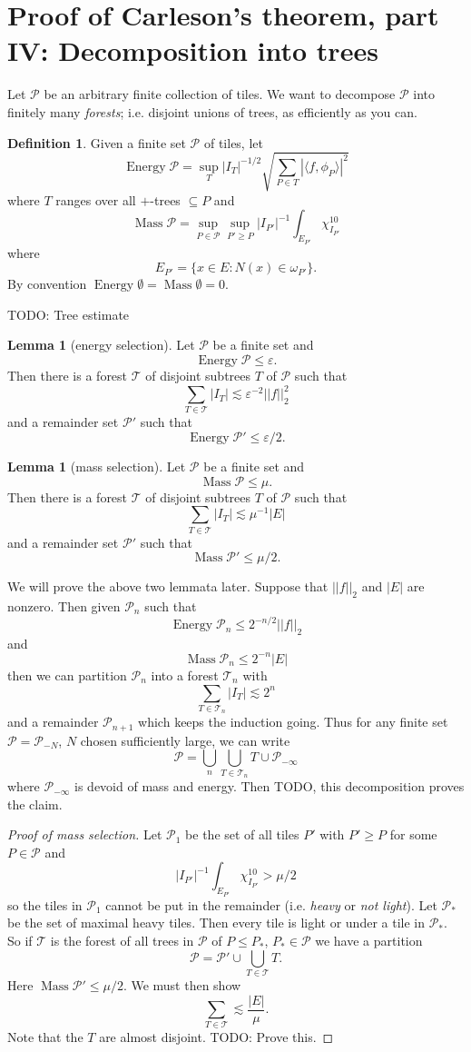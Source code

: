 \documentclass[12pt]{report}
\DeclareMathOperator*{\Energy}{Energy}
\DeclareMathOperator*{\Mass}{Mass}
\newcommand{\dfn}[1]{\emph{#1}\index{#1}}
\theoremstyle{definition}
\newtheorem{lemma}[theorem]{Lemma}
\newtheorem{definition}[theorem]{Definition}
\begin{document}
\section{Proof of Carleson's theorem, part IV: Decomposition into trees}
Let $\mathcal P$ be an arbitrary finite collection of tiles.
We want to decompose $\mathcal P$ into finitely many \dfn{forests}; i.e. disjoint unions of trees, as efficiently as you can.
\begin{definition}
Given a finite set $\mathcal P$ of tiles, let
$$\Energy \mathcal P = \sup_T |I_T|^{-1/2} \sqrt{\sum_{P \in T} |\langle f, \phi_P\rangle|^2}$$
where $T$ ranges over all $+$-trees $\subseteq P$ and
$$\Mass \mathcal P = \sup_{P \in \mathcal P} \sup_{P' \geq P} |I_{P'}|^{-1} \int_{E_{P'}} \chi_{I_{P'}}^{10}$$
where
$$E_{P'} = \{x \in E: N(x) \in \omega_{P'}\}.$$
By convention $\Energy \emptyset = \Mass \emptyset = 0$.
\end{definition}
TODO: Tree estimate
\begin{lemma}[energy selection]
Let $\mathcal P$ be a finite set and
$$\Energy \mathcal P \leq \varepsilon.$$
Then there is a forest $\mathcal T$ of disjoint subtrees $T$ of $\mathcal P$ such that
$$\sum_{T \in \mathcal T} |I_T| \lesssim \varepsilon^{-2} ||f||_2^2$$
and a remainder set $\mathcal P'$ such that
$$\Energy \mathcal P' \leq \varepsilon/2.$$
\end{lemma}
\begin{lemma}[mass selection]
Let $\mathcal P$ be a finite set and
$$\Mass \mathcal P \leq \mu.$$
Then there is a forest $\mathcal T$ of disjoint subtrees $T$ of $\mathcal P$ such that
$$\sum_{T \in \mathcal T} |I_T| \lesssim \mu^{-1}|E|$$
and a remainder set $\mathcal P'$ such that
$$\Mass \mathcal P' \leq \mu/2.$$
\end{lemma}
We will prove the above two lemmata later.
Suppose that $||f||_2$ and $|E|$ are nonzero. Then given $\mathcal P_n$ such that
$$\Energy \mathcal P_n \leq 2^{-n/2} ||f||_2$$
and
$$\Mass \mathcal P_n \leq 2^{-n}|E|$$
then we can partition $\mathcal P_n$ into a forest $\mathcal T_n$ with
$$\sum_{T \in \mathcal T_n} |I_T| \lesssim 2^n$$
and a remainder $\mathcal P_{n+1}$ which keeps the induction going.
Thus for any finite set $\mathcal P = \mathcal P_{-N}$, $N$ chosen sufficiently large, we can write
$$\mathcal P = \bigcup_n \bigcup_{T \in \mathcal T_n} T \cup \mathcal P_{-\infty}$$
where $\mathcal P_{-\infty}$ is devoid of mass and energy.
Then TODO, this decomposition proves the claim.
\begin{proof}[Proof of mass selection]
Let $\mathcal P_1$ be the set of all tiles $P'$ with $P' \geq P$ for some $P \in \mathcal P$ and
$$|I_{P'}|^{-1} \int_{E_{P'}} \chi_{I_{P'}}^{10} > \mu/2$$
so the tiles in $\mathcal P_1$ cannot be put in the remainder (i.e. \dfn{heavy} or \dfn{not light}). Let $\mathcal P_*$ be the set of maximal heavy tiles. Then every tile is light or under a tile in $\mathcal P_*$.
So if $\mathcal T$ is the forest of all trees in $\mathcal P$ of $P \leq P_*$, $P_* \in \mathcal P$ we have a partition
$$\mathcal P = \mathcal P' \cup \bigcup_{T \in \mathcal T} T.$$
Here $\Mass \mathcal P' \leq \mu/2$. We must then show
$$\sum_{T \in \mathcal T} \lesssim \frac{|E|}{\mu}.$$
Note that the $T$ are almost disjoint. TODO: Prove this.
\end{proof}
\end{document}
